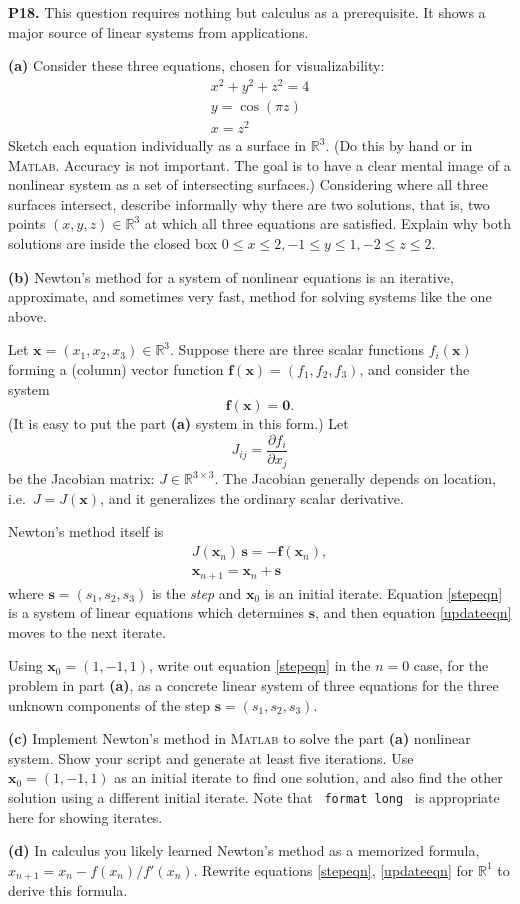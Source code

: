 \documentclass[12pt]{amsart}
\newcommand{\bbf}{\mathbf{f}}
\newcommand{\bs}{\mathbf{s}}
\newcommand{\bx}{\mathbf{x}}
\newcommand{\bzero}{\bm{0}}
\newcommand{\RR}{\mathbb{R}}
\newcommand{\prob}[1]{\bigskip\noindent\textbf{#1.}\quad }
\newcommand{\epart}[1]{\medskip\noindent\textbf{(#1)}\quad }
\newcommand{\Matlab}{\textsc{Matlab}\xspace}
\begin{document}
\prob{P18}  This question requires nothing but calculus as a prerequisite.  It shows a major source of linear systems from applications.

\epart{a}  Consider these three equations, chosen for visualizability:
\begin{gather*}
x^2+y^2+z^2 = 4 \\
y = \cos(\pi z) \\
x = z^2
\end{gather*}
Sketch each equation individually as a surface in $\RR^3$.  (Do this by hand or in \Matlab.  Accuracy is not important.  The goal is to have a clear mental image of a nonlinear system as a set of intersecting surfaces.)  Considering where all three surfaces intersect, describe informally why there are two solutions, that is, two points $(x,y,z)\in\RR^3$ at which all three equations are satisfied.  Explain why both solutions are inside the closed box $0\le x \le 2, -1\le y \le 1, -2\le z \le 2$.

\epart{b}  Newton's method for a system of nonlinear equations is an iterative, approximate, and sometimes very fast, method for solving systems like the one above.

Let $\bx=(x_1,x_2,x_3)\in\RR^3$.  Suppose there are three scalar functions $f_i(\bx)$ forming a (column) vector function $\bbf(\bx)=(f_1,f_2,f_3)$, and consider the system
    $$\bbf(\bx)=\bzero.$$
(It is easy to put the part \textbf{(a)} system in this form.)  Let
	$$J_{ij} = \frac{\partial f_i}{\partial x_j}$$
be the Jacobian matrix: $J\in\RR^{3\times 3}$.  The Jacobian generally depends on location, i.e.~$J=J(\bx)$, and it generalizes the ordinary scalar derivative.

Newton's method itself is
\begin{gather}
J(\bx_n)\, \bs = - \bbf(\bx_n), \label{stepeqn} \\
\bx_{n+1} = \bx_n + \bs \label{updateeqn}
\end{gather}
where $\bs=(s_1,s_2,s_3)$ is the \emph{step} and $\bx_0$ is an initial iterate.  Equation \eqref{stepeqn} is a system of linear equations which determines $\bs$, and then equation \eqref{updateeqn} moves to the next iterate.

Using $\bx_0=(1,-1,1)$, write out equation \eqref{stepeqn} in the $n=0$ case, for the problem in part \textbf{(a)}, as a concrete linear system of three equations for the three unknown components of the step $\bs = (s_1,s_2,s_3)$.

\epart{c}  Implement Newton's method in \Matlab to solve the part \textbf{(a)} nonlinear system.  Show your script and generate at least five iterations.  Use $\bx_0=(1,-1,1)$ as an initial iterate to find one solution, and also find the other solution using a different initial iterate.  Note that \, \texttt{format long} \, is appropriate here for showing iterates.

\epart{d}  In calculus you likely learned Newton's method as a memorized formula, $x_{n+1} = x_n - f(x_n)/f'(x_n)$.  Rewrite equations \eqref{stepeqn}, \eqref{updateeqn} for $\RR^1$ to derive this formula.
\end{document}
